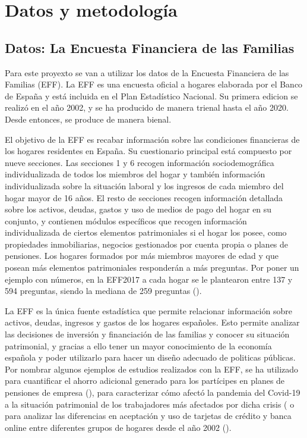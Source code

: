 \chapter{Datos y metodología}
\label{chapter:datos_metodologia}

\section{Datos: La Encuesta Financiera de las Familias}\label{section:datos}

Para este proyexto se van a utilizar los datos de la Encuesta Financiera de las Familias (EFF). La EFF es una encuesta oficial a hogares elaborada por el Banco de España y está incluida en el Plan Estadístico Nacional. Su primera edicion se realizó en el año 2002, y se ha producido de manera trienal hasta el año 2020. Desde entonces, se produce de manera bienal.

El objetivo de la EFF es recabar información sobre las condiciones financieras de los hogares residentes en España. Su cuestionario principal está compuesto por nueve secciones. Las secciones 1 y 6 recogen información sociodemográfica individualizada de todos los miembros del hogar y también información individualizada sobre la situación laboral y los ingresos de cada miembro del hogar mayor de 16 años. El resto de secciones recogen información detallada sobre los activos, deudas, gastos y uso de medios de pago del hogar en su conjunto, y contienen módulos específicos que recogen información individualizada de ciertos elementos patrimoniales si el hogar los posee, como propiedades inmobiliarias, negocios gestionados por cuenta propia o planes de pensiones. Los hogares formados por más miembros mayores de edad y que posean más elementos patrimoniales responderán a más preguntas. Por poner un ejemplo con números, en la EFF2017 a cada hogar se le plantearon entre 137 y 594 preguntas, siendo la mediana de 259 preguntas (\cite{effmethod2017}).

La EFF es la única fuente estadística que permite relacionar información sobre activos, deudas, ingresos y gastos de los hogares españoles. Esto permite analizar las decisiones de inversión y financiación de las familias y conocer su situación patrimonial, y gracias a ello tener un mayor conocimiento de la economía española y poder utilizarlo para hacer un diseño adecuado de politicas públicas. Por nombrar algunos ejemplos de estudios realizados con la EFF, se ha utilizado para cuantificar el ahorro adicional generado para los partícipes en planes de pensiones de empresa (\cite{gomez2022pensiones}), para caracterizar cómo afectó la pandemia del Covid-19 a la situación patrimonial de los trabajadores más afectados por dicha crisis (\cite{alvargonzalez2020pandemia} o para analizar las diferencias en aceptación y uso de tarjetas de crédito y banca online entre diferentes grupos de hogares desde el año 2002 (\cite{crespo2023bancaonline}).

